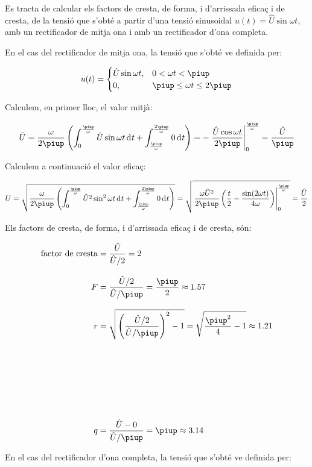 \begin{exemple}[\FactorsCrestaFormaArr{}]
	\addcontentsxms{\FactorsCrestaFormaArr}
    Es tracta de calcular els factors de cresta, de forma, i d'arrissada eficaç i de cresta,
    de la tensió  que s'obté a partir d'una tensió sinusoidal
    $u(t) = \hat{U} \sin\omega t$, amb un rectificador de mitja ona i
    amb un rectificador d'ona completa.

    En el cas del rectificador de mitja ona, la tensió que s'obté ve
    definida per:
    
    \[
    u(t) = \begin{cases} \hat{U} \sin\omega t, & 0 < \omega t < \piup\\
           0, & \piup \leq \omega t \leq 2\piup \end{cases}
    \]

    Calculem, en primer lloc, el valor mitjà:
    
    \[
    \bar{U} = \frac{\omega}{2\piup} \left( \int_0^\frac{\piup}{\omega}
    \hat{U} \sin\omega t \diff t +
    \int_\frac{\piup}{\omega}^\frac{2\piup}{\omega} 0 \diff t \right) = -
    \left. \frac{\hat{U} \cos\omega t}{2\piup}
    \right|_0^\frac{\piup}{\omega} = \frac{\hat{U}}{\piup}
    \]

    Calculem a continuació el valor eficaç:
    
    \[
    U = \sqrt{\frac{\omega}{2\piup} \left( \int_0^\frac{\piup}{\omega}
    \hat{U}^2 \sin^2\omega t \diff t +
    \int_\frac{\piup}{\omega}^\frac{2\piup}{\omega} 0 \diff t \right)} =
      \sqrt{\left.\frac{\omega \hat{U}^2}{2\piup}\left( \frac{t}{2} -
    \frac{\sin (2\omega t)}{4\omega}
    \right)\right|_0^\frac{\piup}{\omega}} = \frac{\hat{U}}{2}
    \]

    Els factors de cresta, de forma, i d'arrissada eficaç i de cresta, són:
    
    \begin{align*}
        \text{factor de cresta} &= \frac{\hat{U}}{\hat{U}/2} = 2 \\[2ex]
        F &= \frac{\hat{U}/2}{\hat{U}/\piup} =\frac{\piup}{2} \approx
        \num{1,57} \\[2ex]
        r &= \sqrt{\left(\frac{\hat{U}/2}{\hat{U}/\piup}\right)^2-1} =
    \sqrt{\frac{\piup^2}{4}-1} \approx \num{1,21} \\[21ex]
        q &= \frac{\hat{U} - 0}{\hat{U}/\piup} = \piup \approx \num{3,14}
    \end{align*}


    En el cas del rectificador d'ona completa, la tensió que s'obté ve
    definida per:
    

\end{exemple}
